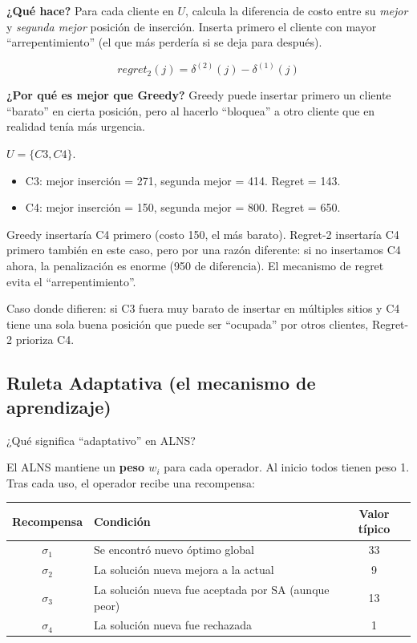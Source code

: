 \documentclass[12pt,a4paper]{article}
\begin{document}
\textbf{¿Qué hace?} Para cada cliente en $U$, calcula la diferencia de costo entre su \emph{mejor} y \emph{segunda mejor} posición de inserción. Inserta primero el cliente con mayor ``arrepentimiento'' (el que más perdería si se deja para después).

$$regret_2(j) = \delta^{(2)}(j) - \delta^{(1)}(j)$$

\textbf{¿Por qué es mejor que Greedy?} Greedy puede insertar primero un cliente ``barato'' en cierta posición, pero al hacerlo ``bloquea'' a otro cliente que en realidad tenía más urgencia.

\begin{ejemplo}
$U = \{C3, C4\}$.
\begin{itemize}
\item C3: mejor inserción = 271, segunda mejor = 414. Regret = 143.
\item C4: mejor inserción = 150, segunda mejor = 800. Regret = 650.
\end{itemize}
Greedy insertaría C4 primero (costo 150, el más barato).
Regret-2 insertaría C4 primero también en este caso, pero por una razón diferente: si no insertamos C4 ahora, la penalización es enorme (950 de diferencia). El mecanismo de regret evita el ``arrepentimiento''.

Caso donde difieren: si C3 fuera muy barato de insertar en múltiples sitios y C4 tiene una sola buena posición que puede ser ``ocupada'' por otros clientes, Regret-2 prioriza C4.
\end{ejemplo}

\subsection{Ruleta Adaptativa (el mecanismo de aprendizaje)}

\begin{pregunta}
¿Qué significa ``adaptativo'' en ALNS?
\end{pregunta}

El ALNS mantiene un \textbf{peso $w_i$} para cada operador. Al inicio todos tienen peso 1. Tras cada uso, el operador recibe una recompensa:

\begin{center}
\begin{tabular}{clc}
\toprule
Recompensa & Condición & Valor típico \\
\midrule
$\sigma_1$ & Se encontró nuevo óptimo global & 33 \\
$\sigma_2$ & La solución nueva mejora a la actual & 9 \\
$\sigma_3$ & La solución nueva fue aceptada por SA (aunque peor) & 13 \\
$\sigma_4$ & La solución nueva fue rechazada & 1 \\
\bottomrule
\end{tabular}
\end{center}
\end{document}
